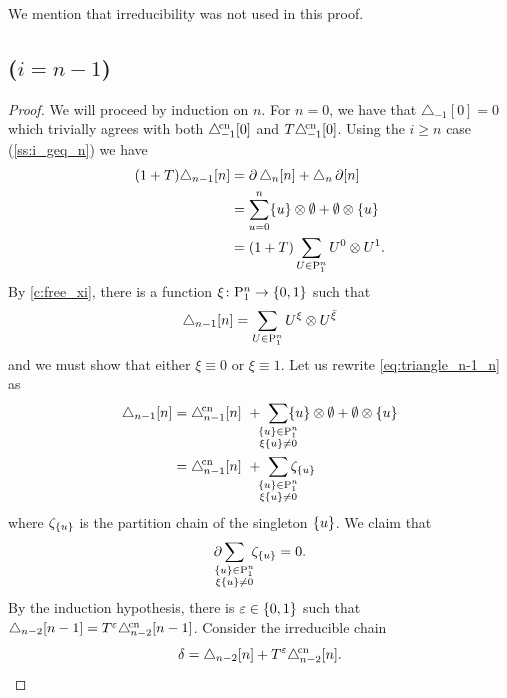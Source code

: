 \begin{remark*}
	We mention that irreducibility was not used in this proof.
\end{remark*}

\subsection{($i = n-1$)}\label{ss:i_equals_n_minus_1}

\begin{proof}
	We will proceed by induction on $n$.
	For $n = 0$, we have that $\triangle_{-1}[0] = 0$ which trivially agrees with both $\triangle^{\!\mathrm{cn}}_{-1}[0]$ and $T\triangle^{\!\mathrm{cn}}_{-1}[0]$.
	Using the $i \geq n$ case (\cref{ss:i_geq_n}) we have
	\begin{align*}
		(1+T)\triangle_{n-1}[n] &=
		\operatorname{\partial}\triangle_n[n] + \triangle_n\operatorname{\partial}[n] \\ &=
		\sum_{u=0}^n \{u\} \otimes \emptyset + \emptyset \otimes \{u\} \\ &=
		(1+T)\sum_{U \in \mathrm{P}_1^n} U^0 \otimes U^1.
	\end{align*}
	By \cref{c:free_xi}, there is a function $\xi \colon \mathrm{P}_1^n \to \{0,1\}$ such that
	\begin{equation}\label{eq:triangle_n-1_n}
		\triangle_{n-1}[n] = \sum_{U \in \mathrm{P}_1^n} U^\xi \otimes U^{\bar{\xi}}
	\end{equation}
	and we must show that either $\xi \equiv 0$ or $\xi \equiv 1$.
	Let us rewrite \cref{eq:triangle_n-1_n} as
	\begin{align*}
		\triangle_{n-1}[n] &=
		\canonical_{n-1}[n] \ + \ \sum_{\mathclap{\substack{\set{u} \in \P_1^n \\ \xi \set{u} \neq 0}}} \set{u} \ot \emptyset + \emptyset \ot \set{u} \\ &=
		\canonical_{n-1}[n] \ + \ \sum_{\mathclap{\substack{\set{u} \in \P_1^n \\ \xi \set{u} \neq 0}}} \zeta_{\set{u}}
	\end{align*}
	where $\zeta_{\{u\}}$ is the partition chain of the singleton $\{u\}$.
	We claim that
	\begin{equation}\label{eq:bd_triangle}
		\bd\sum_{\mathclap{\substack{\set{u} \in \P_1^n \\ \xi \set{u} \neq 0}}} \ \zeta_{\set{u}} = 0.
	\end{equation}
	By the induction hypothesis, there is $\varepsilon \in \{0,1\}$ such that $\triangle_{n-2}[n-1] = T^\varepsilon \triangle^{\!\mathrm{cn}}_{n-2}[n-1]$.
	Consider the irreducible chain
	\[
	\delta = \triangle_{n-2}[n] + T^\varepsilon \triangle^{\!\mathrm{cn}}_{n-2}[n].
\]
\end{proof}
